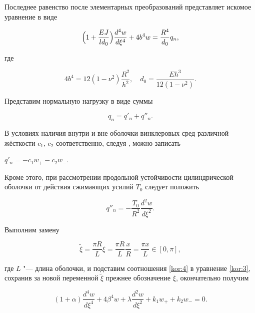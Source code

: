 Последнее равенство после элементарных преобразований представляет искомое уравнение в виде

\begin{equation}

\Bigl(1+\frac{EJ}{ld_0}\Bigr)\frac{d^4 w}{d\xi^4}+4b^4w=\frac{R^4}{d_0}q_n,  

\label{kor:3}

\end{equation}

где

$$4b^4=12(1-\nu^2)\frac{R^2}{h^2}, \quad  d_0=\frac{Eh^3}{12(1-\nu^2)}.$$



Представим нормальную нагрузку в виде суммы

\begin{equation}

q_n=q'_n+q''_n.

\label{kor:4}

\end{equation}

В условиях наличия внутри и вне оболочки винклеровых сред различной жёсткости $c_1$, $c_2$ соответственно, следуя \cite{kor:bib:5}, можно записать


$q'_n=-c_1w_{+}-c_2w_{-}.$



Кроме этого, при рассмотрении продольной устойчивости цилиндрической оболочки от действия сжимающих усилий $T_0$ следует положить \cite{kor:bib:3}

\begin{equation}

q''_n=-\frac{T_0}{R^2}\frac{d^2 w}{d\xi^2}.

\label{kor:6}

\end{equation}



Выполним замену

$$\tilde{\xi}=\displaystyle\frac{\pi R}{L}\xi=\frac{\pi R}{L}\frac{x}{R}=\frac{\pi x}{L}\in[0,\pi],$$

где $L$ "--- длина оболочки, и подставим соотношения \eqref{kor:4} в уравнение \eqref{kor:3}, сохранив за новой переменной $\tilde{\xi}$ прежнее обозначение $\xi$, окончательно получим

\begin{equation}

(1+\alpha)\frac{d^4w}{d\xi^4}+4\beta^4 w+\lambda\frac{d^2 w}{d\xi^2}+k_1 w_+ + k_2 w_- = 0.

\label{kor:7}

\end{equation}

